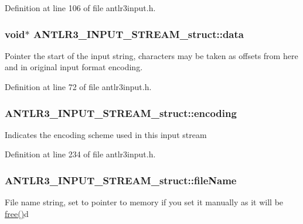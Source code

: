 Definition at line 106 of file antlr3input.\-h.

\hypertarget{struct_a_n_t_l_r3___i_n_p_u_t___s_t_r_e_a_m__struct_adc08e8fb7a312429e31b667cf9c67386}{
\subsubsection[{data}]{\setlength{\rightskip}{0pt plus 5cm}void$\ast$ A\-N\-T\-L\-R3\-\_\-\-I\-N\-P\-U\-T\-\_\-\-S\-T\-R\-E\-A\-M\-\_\-struct\-::data}}\label{struct_a_n_t_l_r3___i_n_p_u_t___s_t_r_e_a_m__struct_adc08e8fb7a312429e31b667cf9c67386}
Pointer the start of the input string, characters may be taken as offsets from here and in original input format encoding. 

Definition at line 72 of file antlr3input.\-h.

\hypertarget{struct_a_n_t_l_r3___i_n_p_u_t___s_t_r_e_a_m__struct_acce3c7aa90181c9e636829746ad666b0}{
\subsubsection[{encoding}]{ A\-N\-T\-L\-R3\-\_\-\-I\-N\-P\-U\-T\-\_\-\-S\-T\-R\-E\-A\-M\-\_\-struct\-::encoding}}\label{struct_a_n_t_l_r3___i_n_p_u_t___s_t_r_e_a_m__struct_acce3c7aa90181c9e636829746ad666b0}
Indicates the encoding scheme used in this input stream 

Definition at line 234 of file antlr3input.\-h.

\hypertarget{struct_a_n_t_l_r3___i_n_p_u_t___s_t_r_e_a_m__struct_abc54ce78713d5c52e306752257932454}{
\subsubsection[{file\-Name}]{ A\-N\-T\-L\-R3\-\_\-\-I\-N\-P\-U\-T\-\_\-\-S\-T\-R\-E\-A\-M\-\_\-struct\-::file\-Name}}\label{struct_a_n_t_l_r3___i_n_p_u_t___s_t_r_e_a_m__struct_abc54ce78713d5c52e306752257932454}
File name string, set to pointer to memory if you set it manually as it will be \hyperlink{struct_a_n_t_l_r3___i_n_p_u_t___s_t_r_e_a_m__struct_a942654996b465ef576470e0beb0519ab}{free()}d 

